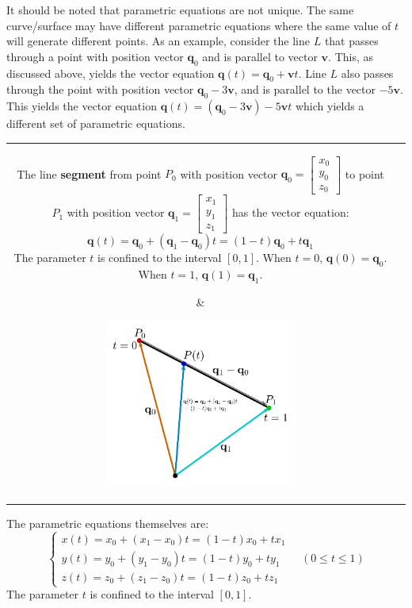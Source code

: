 \documentclass{article}
\begin{document}
It should be noted that parametric equations are not unique. The same curve/surface may have different parametric equations where the same value of \(t\) will generate different points. As an example, consider the line \(L\) that passes through a point with position vector \(\mathbf{q}_0\) and is parallel to vector \(\mathbf{v}\). This, as discussed above, yields the vector equation \(\mathbf{q}(t) = \mathbf{q}_0 + \mathbf{v}t\). Line \(L\) also passes through the point with position vector \(\mathbf{q}_0 - 3\mathbf{v}\), and is parallel to the vector \(-5\mathbf{v}\). This yields the vector equation \(\mathbf{q}(t) = (\mathbf{q}_0 - 3\mathbf{v}) - 5\mathbf{v}t\) which yields a different set of parametric equations.

\begin{tabular}{cc}
\parbox{0.5\textwidth}{
The line {\bf segment} from point \(P_0\) with position vector \(\mathbf{q}_0 = \begin{bmatrix} x_0 \\ y_ 0 \\ z_0 \end{bmatrix}\) to point \(P_1\) with position vector \(\mathbf{q}_1 = \begin{bmatrix} x_1 \\ y_1 \\ z_1 \end{bmatrix}\) has the vector equation:   
\[\mathbf{q}(t) = \mathbf{q}_0 + (\mathbf{q}_1 - \mathbf{q}_0)t  = (1 - t)\mathbf{q}_0 + t \mathbf{q}_1\]
The parameter \(t\) is confined to the interval \([0, 1]\). When \(t = 0\), \(\mathbf{q}(0) = \mathbf{q}_0\). When \(t = 1\), \(\mathbf{q}(1) = \mathbf{q}_1\). 
} & \parbox{0.5\textwidth}{
\includegraphics[width = 0.5\textwidth]{vector_equation_line_segment}
}
\end{tabular}
The parametric equations themselves are:
\[\left\{\begin{array}{c} x(t) = x_0 + (x_1 - x_0)t = (1 - t)x_0 + t x_1 \\ y(t) = y_0 + (y_1 - y_0)t = (1 - t)y_0 + t y_1 \\ z(t) = z_0 + (z_1 - z_0)t = (1 - t)z_0 + t z_1\end{array}\right. \quad (0 \leq t \leq 1)\]
The parameter \(t\) is confined to the interval \([0, 1]\).
\end{document}
